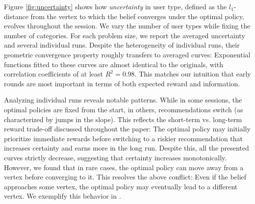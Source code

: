 Figure \ref{fig:uncertainty} shows how \emph{uncertainty} in user type, defined as the $l_1$-distance from the vertex to which the belief converges under the optimal policy, evolves throughout the session. We vary the number of user types while fixing the number of categories. For each problem size, we report the averaged uncertainty and several individual runs. Despite the heterogeneity of individual runs, their geometric convergence property roughly transfers to averaged curves: Exponential functions fitted to these curves are almost identical to the originals, with correlation coefficients of at least $R^2=0.98$. This matches our intuition that early rounds are most important in terms of both expected reward and information.

Analyzing individual runs reveals notable patterns. While in some sessions, the optimal policies are fixed from the start, in others, recommendations switch (as characterized by jumps in the slope). This reflects the short-term vs. long-term reward trade-off discussed throughout the paper: The optimal policy may initially prioritize immediate rewards before switching to a riskier recommendation that increases certainty and earns more in the long run. 
Despite this, all the presented curves strictly decrease, suggesting that certainty increases monotonically. However, we found that in rare cases, the optimal policy can move away from a vertex before converging to it.
This resolves the above conflict: Even if the belief approaches some vertex, the optimal policy may eventually lead to a different vertex. We exemplify this behavior in .

